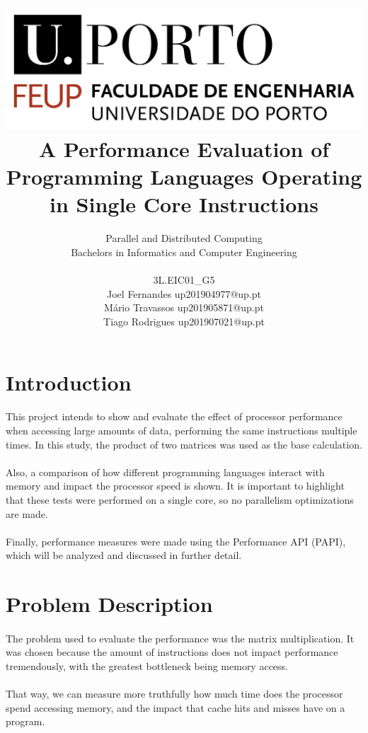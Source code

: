 \documentclass{report}
\title{\includegraphics[scale=0.3]{logo.png} \\ \textbf{A Performance Evaluation of Programming Languages Operating in Single Core Instructions}}
\author{Parallel and Distributed Computing \\ Bachelors in Informatics and Computer Engineering \\ \\ 3L.EIC01\_G5   \\ Joel Fernandes up201904977@up.pt \\ Mário Travassos up201905871@up.pt \\ Tiago Rodrigues up201907021@up.pt }
\begin{document}
    \maketitle

    \section*{Introduction}

    \paragraph{}This project intends to show and evaluate the effect of processor performance when accessing large amounts of data, performing the same instructions multiple times. In this study, the product of two matrices was used as the base calculation.

    \paragraph{}Also, a comparison of how different programming languages interact with memory and impact the processor speed is shown. It is important to highlight that these tests were performed on a single core, so no parallelism optimizations are made.

    \paragraph{}Finally, performance measures were made using the Performance API (PAPI), which will be analyzed and discussed in further detail.

    \section*{Problem Description}

    \paragraph{}The problem used to evaluate the performance was the matrix multiplication. It was chosen because the amount of instructions does not impact performance tremendously, with the greatest bottleneck being memory access.

    \paragraph{}That way, we can measure more truthfully how much time does the processor spend accessing memory, and the impact that cache hits and misses have on a program.
\end{document}
